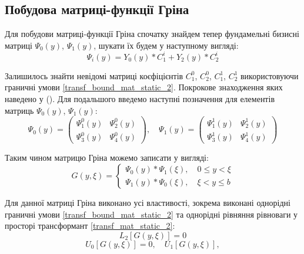 \subsection{Побудова матриці-функції Гріна}
Для побудови матриці-функції Гріна спочатку знайдем тепер фундамельні бизисні матриці $\Psi_0(y)$, $\Psi_1(y)$, шукати їх будем у наступному вигляді:
\begin{equation}\label{psi_static_2}
    \Psi_i(y) = Y_0(y) * C_1^i + Y_2(y) * C_2^i
\end{equation}

Залишилось знайти невідомі матриці коєфіцієнтів $C_1^0$, $C_2^0$, $C_1^1$, $C_2^1$ використовуючи граничні умови \eqref{transf_bound_mat_static_2}.
Покрокове знаходження яких наведено у ().
Для подальшого введемо наступні позначення для елементів матриць $\Psi_0(y)$, $\Psi_1(y)$:
\begin{equation*}
    \Psi_0(y) = \begin{pmatrix}
        \Psi_1^0(y) &  \Psi_2^0(y) \\
        \Psi_3^0(y) &  \Psi_4^0(y) 
    \end{pmatrix}, \quad 
    \Psi_1(y) = \begin{pmatrix}
        \Psi_1^1(y) &  \Psi_2^1(y) \\
        \Psi_3^1(y) &  \Psi_4^1(y) 
    \end{pmatrix}      
\end{equation*}

Таким чином матрицю Гріна можемо записати у вигляді:
\begin{equation}
    G(y,\xi) = 
    \begin{cases}
        \Psi_0(y) * \Psi_1(\xi), \quad 0 \le y < \xi \\
        \Psi_1(y) * \Psi_0(\xi), \quad \xi < y \le b
    \end{cases}
\end{equation}

Для данної матриці Гріна виконано усі властивості, зокрема виконані однорідні граничні умови \eqref{transf_bound_mat_static_2}
та однорідні рівняння рівноваги у просторі трансформант \eqref{transf_mat_static_2}:
\begin{equation*}
    L_2\left[  G(y, \xi) \right] = 0
\end{equation*}
\begin{equation*}
    U_0\left[ G(y, \xi) \right] = 0, \quad  U_1\left[ G(y, \xi) \right],
\end{equation*}

